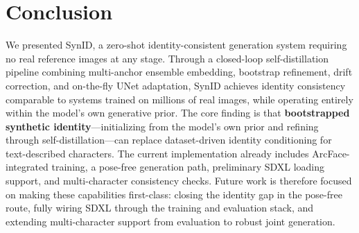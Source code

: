 \documentclass[10pt,twocolumn]{article}
\begin{document}
\section{Conclusion}

We presented SynID, a zero-shot identity-consistent generation system requiring no real reference images at any stage. Through a closed-loop self-distillation pipeline combining multi-anchor ensemble embedding, bootstrap refinement, drift correction, and on-the-fly UNet adaptation, SynID achieves identity consistency comparable to systems trained on millions of real images, while operating entirely within the model's own generative prior. The core finding is that \textbf{bootstrapped synthetic identity}---initializing from the model's own prior and refining through self-distillation---can replace dataset-driven identity conditioning for text-described characters. The current implementation already includes ArcFace-integrated training, a pose-free generation path, preliminary SDXL loading support, and multi-character consistency checks. Future work is therefore focused on making these capabilities first-class: closing the identity gap in the pose-free route, fully wiring SDXL through the training and evaluation stack, and extending multi-character support from evaluation to robust joint generation.
\end{document}
